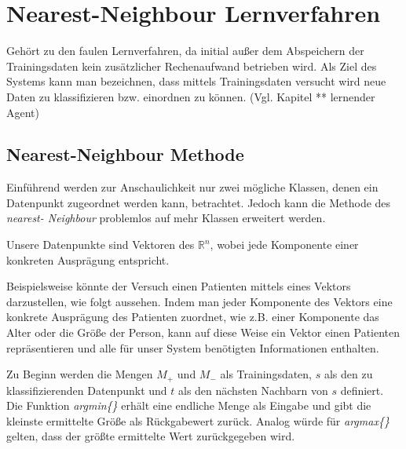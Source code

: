 \documentclass[fontsize=11pt]{scrartcl}
\begin{document}
                        
        \section{Nearest-Neighbour Lernverfahren}
            Gehört zu den faulen Lernverfahren, da initial außer dem Abspeichern der Trainingsdaten kein zusätzlicher Rechenaufwand betrieben wird. Als Ziel des Systems kann man bezeichnen, dass mittels Trainingsdaten versucht wird neue Daten zu klassifizieren bzw. einordnen zu können. (Vgl. Kapitel ** lernender Agent)
                        
            \subsection{Nearest-Neighbour Methode}
                Einführend werden zur Anschaulichkeit nur zwei mögliche Klassen, denen ein Datenpunkt zugeordnet werden kann, betrachtet. Jedoch kann die Methode des \emph{nearest- Neighbour} problemlos auf mehr Klassen erweitert werden.\par
                Unsere Datenpunkte sind Vektoren des $\mathbb{R}^n$, wobei jede Komponente einer konkreten Ausprägung entspricht.\par
                Beispielsweise könnte der Versuch einen Patienten mittels eines Vektors darzustellen, wie folgt aussehen. Indem man jeder Komponente des Vektors eine konkrete Ausprägung des Patienten zuordnet, wie z.B. einer Komponente das Alter oder die Größe der Person, kann auf diese Weise ein Vektor einen Patienten repräsentieren und alle für unser System benötigten Informationen enthalten.\par
                Zu Beginn werden die Mengen $M_+$ und $M_-$ als Trainingsdaten, $s$ als den zu klassifizierenden Datenpunkt und $t$ als den nächsten Nachbarn von $s$ definiert. Die Funktion \emph{argmin\{\}} erhält eine endliche Menge als Eingabe und gibt die kleinste ermittelte Größe als Rückgabewert zurück. Analog würde für \emph{argmax\{\}} gelten, dass der größte ermittelte Wert zurückgegeben wird.\par
                        
\end{document}
